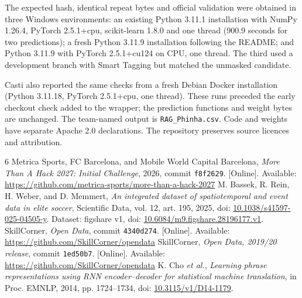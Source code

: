 \documentclass[conference,a4paper]{IEEEtran}
\begin{document}
The expected hash, identical repeat bytes and official validation were obtained
in three Windows environments: an existing Python 3.11.1 installation with
NumPy 1.26.4, PyTorch 2.5.1+cpu, scikit-learn 1.8.0 and one thread (900.9 seconds
for two predictions); a fresh Python 3.11.9 installation following the README;
and Python 3.11.9 with PyTorch 2.5.1+cu124 on CPU, one thread. The third used a
development branch with Smart Tagging but matched the unmasked candidate.

Casti also reported the same checks from a fresh Debian Docker installation
(Python 3.11.18, PyTorch 2.5.1+cpu, one thread). These runs preceded the early
checkout check added to the wrapper; the prediction functions and weight bytes
are unchanged.
The team-named output is \texttt{RAG\_Phinha.csv}. Code and weights have separate
Apache 2.0 declarations. The repository preserves source licences and attribution.

\begin{thebibliography}{6}
Metrica Sports, FC Barcelona, and Mobile World Capital Barcelona,
\emph{More Than A Hack 2027: Initial Challenge}, 2026, commit
\texttt{f8f2629}.
[Online]. Available: \url{https://github.com/metrica-sports/more-than-a-hack-2027}
M. Bassek, R. Rein, H. Weber, and D. Memmert,
\emph{An integrated dataset of spatiotemporal and event data in elite soccer},
Scientific Data, vol. 12, art. 195, 2025,
doi: \href{https://doi.org/10.1038/s41597-025-04505-y}{10.1038/s41597-025-04505-y}.
Dataset: figshare v1, doi:
\href{https://doi.org/10.6084/m9.figshare.28196177.v1}{10.6084/m9.figshare.28196177.v1}.
SkillCorner, \emph{Open Data}, commit
\texttt{4340d274}.
[Online]. Available: \url{https://github.com/SkillCorner/opendata}
SkillCorner, \emph{Open Data, 2019/20 release}, commit
\texttt{1ed50b7}.
[Online]. Available: \url{https://github.com/SkillCorner/opendata}
K. Cho \emph{et al.}, \emph{Learning phrase representations using RNN
encoder--decoder for statistical machine translation}, in Proc. EMNLP,
2014, pp. 1724--1734, doi:
\href{https://doi.org/10.3115/v1/D14-1179}{10.3115/v1/D14-1179}.
\end{thebibliography}
\end{document}
